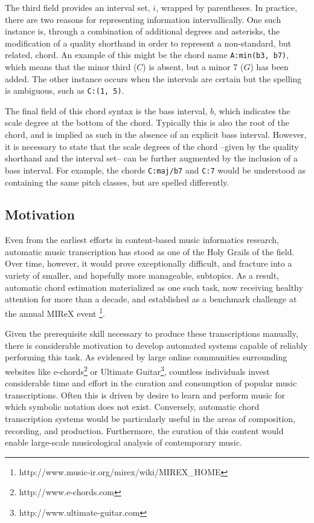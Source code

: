 The third field provides an interval set, $i$, wrapped by parentheses.
In practice, there are two reasons for representing information intervallically.
One such instance is, through a combination of additional degrees and asterisks, the modification of a quality shorthand in order to represent a non-standard, but related, chord.
An example of this might be the chord name \texttt{A:min(\*b3, b7)}, which means that the minor third ($C$) is absent, but a minor 7 ($G$) has been added.
The other instance occurs when the intervals are certain but the spelling is ambiguous, such as \texttt{C:(1, 5)}. %

The final field of this chord syntax is the bass interval, $b$, which indicates the scale degree at the bottom of the chord.
Typically this is also the root of the chord, and is implied as such in the absence of an explicit bass interval.
However, it is necessary to state that the scale degrees of the chord --given by the quality shorthand and the interval set-- can be further augmented by the inclusion of a bass interval.
For example, the chords \texttt{C:maj/b7} and \texttt{C:7} would be understood as containing the same pitch classes, but are spelled differently.


\subsection{Motivation}
\label{subsec:motivation}

Even from the earliest efforts in content-based music informatics research, automatic music transcription has stood as one of the Holy Grails of the field.
Over time, however, it would prove exceptionally difficult, and fracture into a variety of smaller, and hopefully more manageable, subtopics.
As a result, automatic chord estimation materialized as one such task, now receiving healthy attention for more than a decade, and established as a benchmark challenge at the annual MIReX event \footnote{{http://www.music-ir.org/mirex/wiki/MIREX\_HOME}}.

Given the prerequisite skill necessary to produce these transcriptions manually, there is considerable motivation to develop automated systems capable of reliably performing this task.
As evidenced by large online communities surrounding websites like e-chords\footnote{http://www.e-chords.com} or Ultimate Guitar\footnote{http://www.ultimate-guitar.com}, countless individuals invest considerable time and effort in the curation and consumption of popular music transcriptions.
Often this is driven by desire to learn and perform music for which symbolic notation does not exist.
Conversely, automatic chord transcription systems would be particularly useful in the areas of composition, recording, and production.
Furthermore, the curation of this content would enable large-scale musicological analysis of contemporary music.

